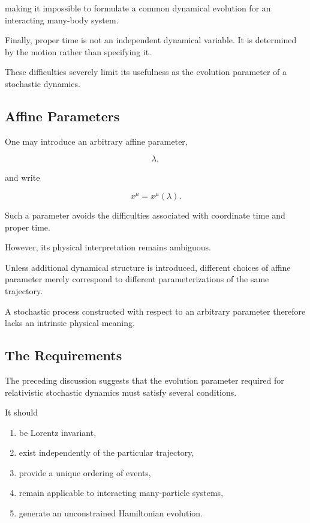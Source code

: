 making it impossible to formulate a common dynamical evolution for an
interacting many-body system.

Finally, proper time is not an independent dynamical variable. It is
determined by the motion rather than specifying it.

These difficulties severely limit its usefulness as the evolution
parameter of a stochastic dynamics.

\subsection{Affine Parameters}

One may introduce an arbitrary affine parameter,

\[
\lambda,
\]

and write

\[
x^\mu=x^\mu(\lambda).
\]

Such a parameter avoids the difficulties associated with coordinate time
and proper time.

However, its physical interpretation remains ambiguous.

Unless additional dynamical structure is introduced, different choices
of affine parameter merely correspond to different parameterizations of
the same trajectory.

A stochastic process constructed with respect to an arbitrary parameter
therefore lacks an intrinsic physical meaning.

\subsection{The Requirements}

The preceding discussion suggests that the evolution parameter required
for relativistic stochastic dynamics must satisfy several conditions.

It should

\begin{enumerate}

\item be Lorentz invariant,

\item exist independently of the particular trajectory,

\item provide a unique ordering of events,

\item remain applicable to interacting many-particle systems,

\item generate an unconstrained Hamiltonian evolution.

\end{enumerate}


